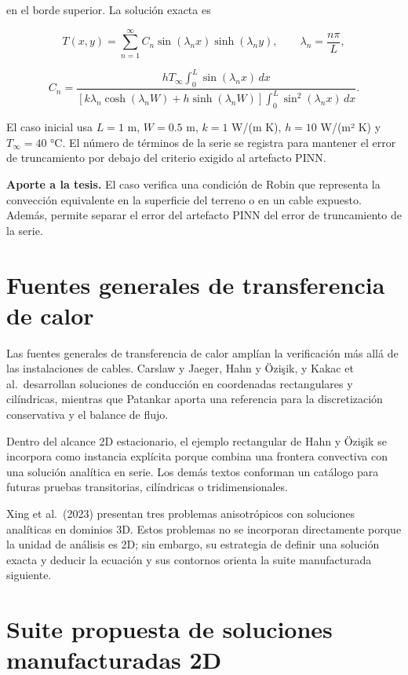 \documentclass[11pt,a4paper,oneside]{report}
\begin{document}
en el borde superior. La solución exacta es

\[
T(x,y)=\sum_{n=1}^{\infty}C_n\sin(\lambda_n x)\sinh(\lambda_n y),
\qquad \lambda_n=\frac{n\pi}{L},
\]

\[
C_n=\frac{hT_\infty\int_0^L\sin(\lambda_nx)\,dx}
{[k\lambda_n\cosh(\lambda_nW)+h\sinh(\lambda_nW)]\int_0^L\sin^2(\lambda_nx)\,dx}.
\]

El caso inicial usa \(L=1\) m, \(W=0.5\) m, \(k=1\) W/(m K), \(h=10\)
W/(m² K) y \(T_\infty=40\) °C. El número de términos de la serie se
registra para mantener el error de truncamiento por debajo del criterio
exigido al artefacto PINN.

\textbf{Aporte a la tesis.} El caso verifica una condición de Robin que
representa la convección equivalente en la superficie del terreno o en
un cable expuesto. Además, permite separar el error del artefacto PINN
del error de truncamiento de la serie.

\section{Fuentes generales de transferencia de
calor}\label{fuentes-generales-de-transferencia-de-calor}

Las fuentes generales de transferencia de calor amplían la verificación
más allá de las instalaciones de cables. Carslaw y Jaeger, Hahn y
Özişik, y Kakac et al.~desarrollan soluciones de conducción en
coordenadas rectangulares y cilíndricas, mientras que Patankar aporta
una referencia para la discretización conservativa y el balance de
flujo.

Dentro del alcance 2D estacionario, el ejemplo rectangular de Hahn y
Özişik se incorpora como instancia explícita porque combina una frontera
convectiva con una solución analítica en serie. Los demás textos
conforman un catálogo para futuras pruebas transitorias, cilíndricas o
tridimensionales.

Xing et al.~(2023) presentan tres problemas anisotrópicos con soluciones
analíticas en dominios 3D. Estos problemas no se incorporan directamente
porque la unidad de análisis es 2D; sin embargo, su estrategia de
definir una solución exacta y deducir la ecuación y sus contornos
orienta la suite manufacturada siguiente.

\section{Suite propuesta de soluciones manufacturadas
2D}\label{suite-propuesta-de-soluciones-manufacturadas-2d}
\end{document}
